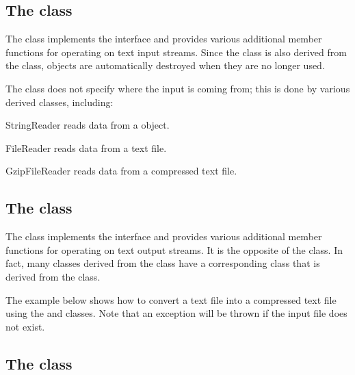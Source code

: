\subsection*{The  class}

The  class implements the  interface and
provides various additional member functions for operating on text input
streams. Since the  class is also derived from the
 class,  objects are automatically destroyed
when they are no longer used.

The  class does not specify where the input is coming from;
this is done by various derived classes, including:

\begin{Description}

  \item[StringReader] reads data from a  object.

  \item[FileReader] reads data from a text file.

  \item[GzipFileReader] reads data from a compressed text file.

\end{Description}


\subsection*{The  class}

The  class implements the  interface and
provides various additional member functions for operating on text output
streams. It is the opposite of the  class. In fact, many
classes derived from the  class have a corresponding
class that is derived from the  class.

The example below shows how to convert a text file into a compressed text
file using the  and  classes. Note
that an exception will be thrown if the input file does not exist.



\subsection*{The  class}

